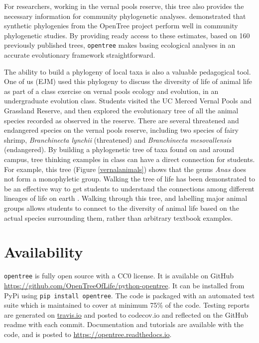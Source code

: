 \documentclass[oupdraft]{sysbio_sse}
\begin{document}
For researchers, working in the vernal pools reserve, this tree also provides the necessary information for community phylogenetic analyses. \citet{li_for_2019} demonstrated that synthetic phylogenies from the OpenTree project perform well in community phylogenetic studies. By providing ready access to these estimates, based on 160 previously published trees, \texttt{opentree} makes basing ecological analyses in an accurate evolutionary framework straightforward.


The ability to build a phylogeny of local taxa is also a valuable pedagogical tool. One of us (EJM) used this phylogeny to discuss the diversity of life of animal life as part of a class exercise on vernal pools ecology and evolution, in an undergraduate evolution class.
Students visited the UC Merced Vernal Pools and Grassland Reserve, and then explored the evolutionary tree of all the animal species recorded as observed in the reserve.
There are several threatened and endangered species on the vernal pools reserve, including two species of fairy shrimp, \textit{Branchinecta lynchii} (threatened) and \textit{Branchinecta mesovallensis} (endangered).
By building a phylogenetic tree of taxa found on and around campus, tree thinking examples in class can have a direct connection for students. For example, this tree (Figure \ref{vernalanimals}) shows that the genus \textit{Anas} does not form a monophyletic group. Walking the tree of life has been demonstrated to be an effective way to get students to understand the connections among different lineages of life on earth \citep{ballen_walking_2017}. Walking through this tree, and labelling major animal groups allows students to connect to the diversity of animal life based on the actual species surrounding them, rather than arbitrary textbook examples.



\section{Availability}
\label{sec5}

\texttt{opentree} is fully open source with a CC0 license. It is available on GitHub \url{ https://github.com/OpenTreeOfLife/python-opentree}. It can be installed from PyPi using \texttt{pip install opentree}. The code is packaged with an automated test suite which is maintained to cover at minimum 75\% of the code. Testing reports are generated on \url{travis.io} and posted to {codecov.io} and reflected on the GitHub readme with each commit. Documentation and tutorials are available with the code, and is posted to \url{https://opentree.readthedocs.io}.
\end{document}
